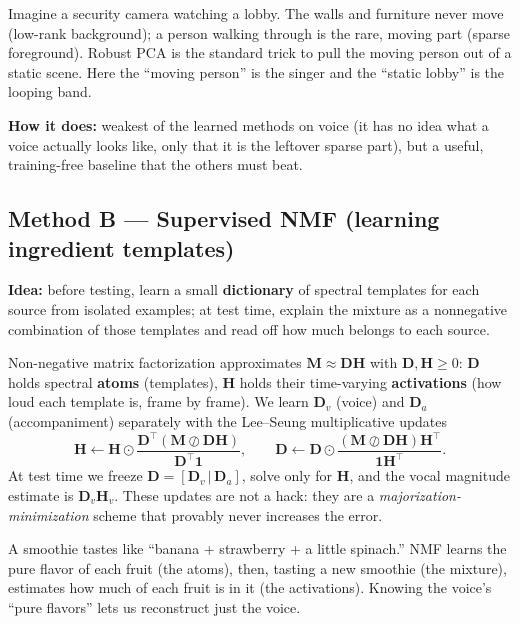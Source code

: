 \documentclass[11pt]{article}
\begin{document}
\begin{analogy}
Imagine a security camera watching a lobby. The walls and furniture never move
(low-rank background); a person walking through is the rare, moving part (sparse
foreground). Robust PCA is the standard trick to pull the moving person out of a
static scene. Here the ``moving person'' is the singer and the ``static lobby'' is
the looping band.
\end{analogy}

\textbf{How it does:} weakest of the learned methods on voice (it has no idea what a
voice actually looks like, only that it is the leftover sparse part), but a useful,
training-free baseline that the others must beat.

\subsection{Method B --- Supervised NMF (learning ingredient templates)}
\textbf{Idea:} before testing, learn a small \textbf{dictionary} of spectral
templates for each source from isolated examples; at test time, explain the mixture
as a nonnegative combination of those templates and read off how much belongs to
each source.

\begin{slowmath}
Non-negative matrix factorization approximates $\bm M\approx\bm D\bm H$ with
$\bm D,\bm H\ge0$: $\bm D$ holds spectral \textbf{atoms} (templates), $\bm H$ holds
their time-varying \textbf{activations} (how loud each template is, frame by frame).
We learn $\bm D_v$ (voice) and $\bm D_a$ (accompaniment) separately with the
Lee--Seung multiplicative updates
\[
\bm H\leftarrow\bm H\odot\frac{\bm D^\top(\bm M\oslash\bm D\bm H)}{\bm D^\top\bm 1},
\qquad
\bm D\leftarrow\bm D\odot\frac{(\bm M\oslash\bm D\bm H)\bm H^\top}{\bm 1\bm H^\top}.
\]
At test time we freeze $\bm D=[\bm D_v\,|\,\bm D_a]$, solve only for $\bm H$, and the
vocal magnitude estimate is $\bm D_v\bm H_v$. These updates are not a hack: they are
a \emph{majorization-minimization} scheme that provably never increases the error.
\end{slowmath}

\begin{analogy}
A smoothie tastes like ``banana + strawberry + a little spinach.'' NMF learns the
pure flavor of each fruit (the atoms), then, tasting a new smoothie (the mixture),
estimates how much of each fruit is in it (the activations). Knowing the voice's
``pure flavors'' lets us reconstruct just the voice.
\end{analogy}
\end{document}
